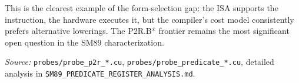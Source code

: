This is the clearest example of the form-selection gap: the ISA supports
the instruction, the hardware executes it, but the compiler's cost model
consistently prefers alternative lowerings.  The P2R.B* frontier remains
the most significant open question in the SM89 characterization.

\textit{Source:} \texttt{probes/probe\_p2r\_*.cu},
\texttt{probes/probe\_predicate\_*.cu},
detailed analysis in \texttt{SM89\_PREDICATE\_REGISTER\_ANALYSIS.md}.
